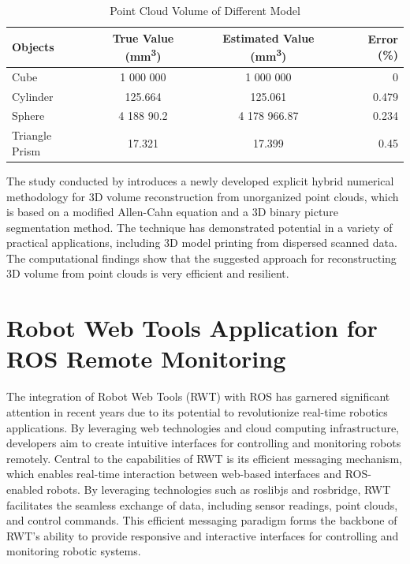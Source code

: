 \begin{table}[H]
	\caption{Point Cloud Volume of Different Model}
	\label{tab:Point Cloud Volume of Different Objects}
	\centering
	\begin{tabular}{l c c r}
		\toprule
		\textbf{Objects} & \textbf{True Value (\si{mm^3})} & \textbf{Estimated Value (\si{mm^3})} & \textbf{Error} (\%) \\
		\midrule
		Cube             & 1 000 000                       & 1 000 000                            & 0                   \\

		Cylinder         & 125.664                         & 125.061                              & 0.479               \\

		Sphere           & 4 188 90.2                      & 4 178 966.87                         & 0.234               \\

		Triangle Prism   & 17.321                          & 17.399                               & 0.45                \\
		\bottomrule
	\end{tabular}
\end{table}

The study conducted by \citet{jeong2018} introduces a newly developed explicit hybrid numerical methodology for 3D volume reconstruction from unorganized point clouds, which is based on a modified Allen-Cahn equation and a 3D binary picture segmentation method. The technique has demonstrated potential in a variety of practical applications, including 3D model printing from dispersed scanned data. The computational findings show that the suggested approach for reconstructing 3D volume from point clouds is very efficient and resilient.

\section{Robot Web Tools Application for ROS Remote Monitoring}

The integration of Robot Web Tools (RWT) with ROS has garnered significant attention in recent years due to its potential to revolutionize real-time robotics applications. By leveraging web technologies and cloud computing infrastructure, developers aim to create intuitive interfaces for controlling and monitoring robots remotely. Central to the capabilities of RWT is its efficient messaging mechanism, which enables real-time interaction between web-based interfaces and ROS-enabled robots. By leveraging technologies such as roslibjs and rosbridge, RWT facilitates the seamless exchange of data, including sensor readings, point clouds, and control commands. This efficient messaging paradigm forms the backbone of RWT's ability to provide responsive and interactive interfaces for controlling and monitoring robotic systems.

